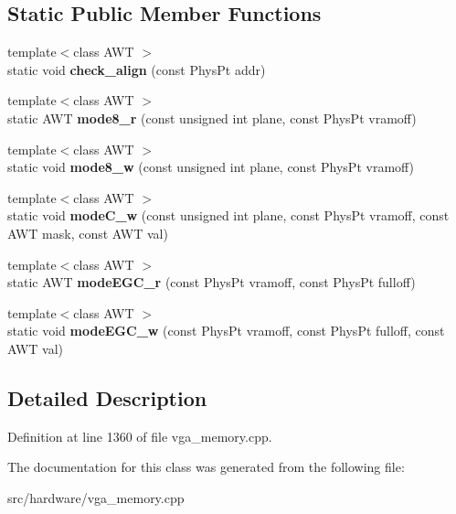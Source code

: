 \subsection*{Static Public Member Functions}
\begin{DoxyCompactItemize}
\item 
\hypertarget{classVGA__PC98__PageHandler_ad0cab17b7f08ec55aea9fa00c6154ef5}{{\footnotesize template$<$class A\-W\-T $>$ }\\static void {\bfseries check\-\_\-align} (const Phys\-Pt addr)}\label{classVGA__PC98__PageHandler_ad0cab17b7f08ec55aea9fa00c6154ef5}

\item 
\hypertarget{classVGA__PC98__PageHandler_a258b7ab8e0bf52a16e15c16ab0811670}{{\footnotesize template$<$class A\-W\-T $>$ }\\static A\-W\-T {\bfseries mode8\-\_\-r} (const unsigned int plane, const Phys\-Pt vramoff)}\label{classVGA__PC98__PageHandler_a258b7ab8e0bf52a16e15c16ab0811670}

\item 
\hypertarget{classVGA__PC98__PageHandler_a64b218e643644a33e0c298622dbe72b9}{{\footnotesize template$<$class A\-W\-T $>$ }\\static void {\bfseries mode8\-\_\-w} (const unsigned int plane, const Phys\-Pt vramoff)}\label{classVGA__PC98__PageHandler_a64b218e643644a33e0c298622dbe72b9}

\item 
\hypertarget{classVGA__PC98__PageHandler_ad50a2f65155811c9398c8c17ccf65fb1}{{\footnotesize template$<$class A\-W\-T $>$ }\\static void {\bfseries mode\-C\-\_\-w} (const unsigned int plane, const Phys\-Pt vramoff, const A\-W\-T mask, const A\-W\-T val)}\label{classVGA__PC98__PageHandler_ad50a2f65155811c9398c8c17ccf65fb1}

\item 
\hypertarget{classVGA__PC98__PageHandler_a12e4eba4a8b70a108fa7623c3333043e}{{\footnotesize template$<$class A\-W\-T $>$ }\\static A\-W\-T {\bfseries mode\-E\-G\-C\-\_\-r} (const Phys\-Pt vramoff, const Phys\-Pt fulloff)}\label{classVGA__PC98__PageHandler_a12e4eba4a8b70a108fa7623c3333043e}

\item 
\hypertarget{classVGA__PC98__PageHandler_aea2664bee908ecf657cb3d114303d867}{{\footnotesize template$<$class A\-W\-T $>$ }\\static void {\bfseries mode\-E\-G\-C\-\_\-w} (const Phys\-Pt vramoff, const Phys\-Pt fulloff, const A\-W\-T val)}\label{classVGA__PC98__PageHandler_aea2664bee908ecf657cb3d114303d867}

\end{DoxyCompactItemize}


\subsection{Detailed Description}


Definition at line 1360 of file vga\-\_\-memory.\-cpp.



The documentation for this class was generated from the following file\-:\begin{DoxyCompactItemize}
\item 
src/hardware/vga\-\_\-memory.\-cpp\end{DoxyCompactItemize}
